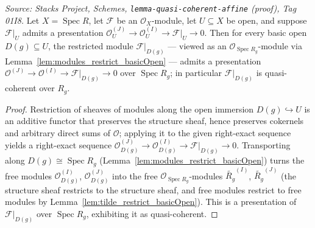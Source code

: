 \begin{lemma}
  \label{lem:presentation_restrict_basicOpen}
  \textit{Source: Stacks Project, Schemes, \texttt{lemma-quasi-coherent-affine} (proof),
  Tag 01I8.}
  Let \(X = \operatorname{Spec} R\), let \(\mathcal{F}\) be an \(\mathcal{O}_X\)-module, let
  \(U \subseteq X\) be open, and suppose \(\mathcal{F}|_U\) admits a presentation
  \(\mathcal{O}_U^{(J)} \to \mathcal{O}_U^{(I)} \to \mathcal{F}|_U \to 0\). Then for every
  basic open \(D(g) \subseteq U\), the restricted module
  \(\mathcal{F}|_{D(g)}\) — viewed as an \(\mathcal{O}_{\operatorname{Spec} R_g}\)-module via
  Lemma~\ref{lem:modules_restrict_basicOpen} — admits a presentation
  \(\mathcal{O}^{(J)} \to \mathcal{O}^{(I)} \to \mathcal{F}|_{D(g)} \to 0\) over
  \(\operatorname{Spec} R_g\); in particular \(\mathcal{F}|_{D(g)}\) is quasi-coherent over
  \(R_g\).
\end{lemma}
\begin{proof}
  Restriction of sheaves of modules along the open immersion
  \(D(g) \hookrightarrow U\) is an additive functor that preserves the structure sheaf, hence
  preserves cokernels and arbitrary direct sums of \(\mathcal{O}\); applying it to the given
  right-exact sequence yields a right-exact sequence
  \(\mathcal{O}_{D(g)}^{(J)} \to \mathcal{O}_{D(g)}^{(I)} \to \mathcal{F}|_{D(g)} \to 0\).
  Transporting along \(D(g) \cong \operatorname{Spec} R_g\)
  (Lemma~\ref{lem:modules_restrict_basicOpen}) turns the free modules
  \(\mathcal{O}_{D(g)}^{(I)}\), \(\mathcal{O}_{D(g)}^{(J)}\) into the free
  \(\mathcal{O}_{\operatorname{Spec} R_g}\)-modules \(\widetilde{R_g}^{(I)}\),
  \(\widetilde{R_g}^{(J)}\) (the structure sheaf restricts to the structure sheaf, and free
  modules restrict to free modules by Lemma~\ref{lem:tilde_restrict_basicOpen}). This is a
  presentation of \(\mathcal{F}|_{D(g)}\) over \(\operatorname{Spec} R_g\), exhibiting it as
  quasi-coherent.
\end{proof}


